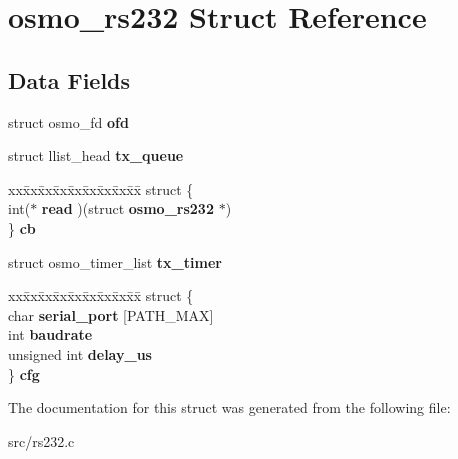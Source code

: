 \section{osmo\+\_\+rs232 Struct Reference}
\label{structosmo__rs232}
\subsection*{Data Fields}
\begin{DoxyCompactItemize}
\item 
struct osmo\+\_\+fd {\bfseries ofd}\label{structosmo__rs232_a812a1e053b281246ec1fd42d61bda1bd}

\item 
struct llist\+\_\+head {\bfseries tx\+\_\+queue}\label{structosmo__rs232_acd209ed3eded625ce61c7a84487cd3df}

\item 
\begin{tabbing}
xx\=xx\=xx\=xx\=xx\=xx\=xx\=xx\=xx\=\kill
struct \{\\
\>int($\ast$ {\bfseries read} )(struct {\bf osmo\_rs232} $\ast$)\\
\} {\bfseries cb}\label{structosmo__rs232_ac315b9c72f44a9e4afb922131363f7e6}
\\

\end{tabbing}\item 
struct osmo\+\_\+timer\+\_\+list {\bfseries tx\+\_\+timer}\label{structosmo__rs232_a807b616c3d96a2988a48cf46d023c058}

\item 
\begin{tabbing}
xx\=xx\=xx\=xx\=xx\=xx\=xx\=xx\=xx\=\kill
struct \{\\
\>char {\bfseries serial\_port} [PATH\_MAX]\\
\>int {\bfseries baudrate}\\
\>unsigned int {\bfseries delay\_us}\\
\} {\bfseries cfg}\label{structosmo__rs232_a41ef0fb7725e18447c8fabc0d1428c60}
\\

\end{tabbing}\end{DoxyCompactItemize}


The documentation for this struct was generated from the following file\+:\begin{DoxyCompactItemize}
\item 
src/rs232.\+c\end{DoxyCompactItemize}
